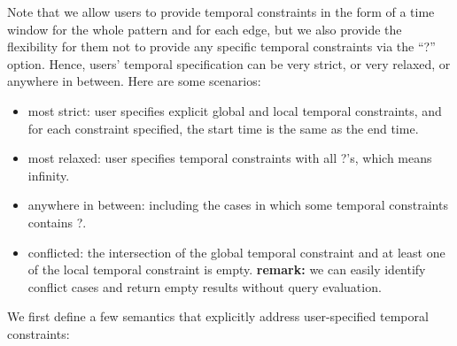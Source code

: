 Note that we allow users to provide temporal constraints in the form of a time
window for the whole pattern and for each edge, but we also provide the
flexibility for them not to provide any specific temporal constraints via the
``?'' option. Hence, users' temporal specification can be very strict, or very
relaxed, or anywhere in between. Here are some scenarios:

\begin{itemize}
        \item most strict: user specifies explicit global and local temporal
          constraints, and for each constraint specified, the start time is the
          same as the end time.
	\item most relaxed: user specifies temporal constraints with all ?'s, which means infinity.
	\item anywhere in between: including the cases in which some temporal constraints contains ?. 
        \item conflicted: the intersection of the global temporal constraint and
          at least one of the local temporal constraint is empty. {\bf remark:}
          we can easily identify conflict cases and return empty results without
          query evaluation.
\end{itemize}

We first define a few semantics that explicitly address user-specified temporal
constraints:

